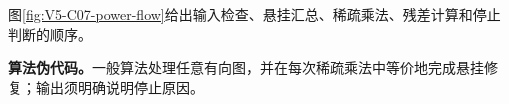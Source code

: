 \documentclass[UTF8,a4paper,11pt,openany]{ctexbook}
\begin{document}
\setcounter{page}{909}
\setcounter{chapter}{36}
\setcounter{section}{4}
\setcounter{figure}{7}
\pagestyle{headings}
图\ref{fig:V5-C07-power-flow}给出输入检查、悬挂汇总、稀疏乘法、残差计算和停止判断的顺序。

\FloatBarrier
\textbf{算法伪代码。}一般算法处理任意有向图，并在每次稀疏乘法中等价地完成悬挂修复；输出须明确说明停止原因。
\end{document}
